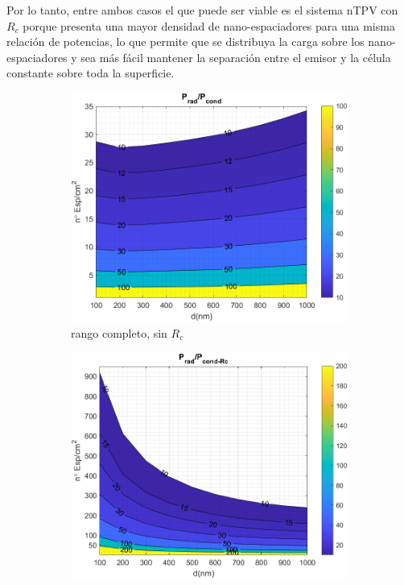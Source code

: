 Por lo tanto, entre ambos casos el que puede ser viable es el sistema nTPV con $R_c$ porque presenta una mayor densidad de nano-espaciadores para una misma relación de potencias, lo que permite que se distribuya la carga sobre los nano-espaciadores y sea más fácil mantener la separación entre el emisor y la célula constante sobre toda la superficie.
\begin{figure}[H]
		\begin{subfigure}[b]{0.49\textwidth}
		\centering
		\includegraphics[width=1.00\textwidth]{figuras/Resultados/RelacionCondRad/SiGe_full.png}
		\caption{rango completo, sin $R_c$}
		\label{fig:rel_SiSiO2Ge_full}
	\end{subfigure}
		\hfill
		\begin{subfigure}[b]{0.49\textwidth}
			\centering
			\includegraphics[width=1.00\textwidth]{figuras/Resultados/RelacionCondRad/SiGe_Rc_full_10.png}

\end{subfigure}
\end{figure}
